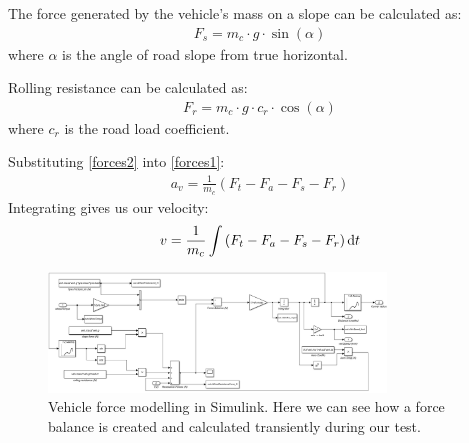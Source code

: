 \documentclass[11pt]{article}
\numberwithin{equation}{section}
\begin{document}
The force generated by the vehicle's mass on a slope can be calculated as:
\begin{gather}
    F_s = m_c \cdot g \cdot \sin\left(\alpha\right)
\end{gather}
where $\alpha$ is the angle of road slope from true horizontal. 

Rolling resistance can be calculated as:
\begin{gather}
    F_r = m_c \cdot g \cdot c_r \cdot \cos \left(\alpha\right)
\end{gather}
where $c_r$ is the road load coefficient.

Substituting \ref{forces2} into \ref{forces1}:
\begin{gather}
    a_v = \frac{1}{m_c}\left(F_t - F_a - F_s - F_r\right)
\end{gather}
Integrating gives us our velocity:
\begin{gather}
    v = \frac{1}{m_c}\int\left(F_t - F_a - F_s - F_r\right)\dif t
\end{gather}
\begin{figure}[H]
    \centering
    \includegraphics[width = 0.8\textwidth]{./img/vehicleModel.png}
    \caption{Vehicle force modelling in Simulink. Here we can see how a force balance is created and calculated transiently during our test.}
    \label{vehicleBlock}
\end{figure}
\end{document}

